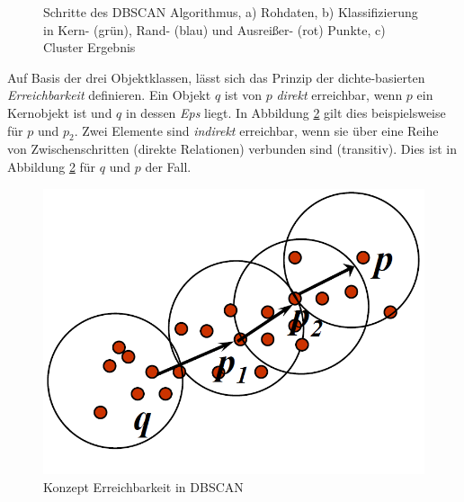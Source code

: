 \begin{figure}[H]
    \centering
    \caption[Schritte des DBSCAN Algorithmus]{Schritte des DBSCAN Algorithmus, a) Rohdaten, b) Klassifizierung in Kern- (grün), Rand- (blau) und Ausreißer- (rot) Punkte, c) Cluster Ergebnis \cite[]{Gao2012}}
    \label{fig:grund_dbscan_clustering}
\end{figure}

Auf Basis der drei Objektklassen, lässt sich das Prinzip der dichte-basierten \textit{Erreichbarkeit} definieren.
Ein Objekt $q$ ist von $p$ \textit{direkt} erreichbar, wenn $p$ ein Kernobjekt ist und $q$ in dessen \textit{Eps} liegt.
In Abbildung \ref{fig:grund_dbscan_reachability} gilt dies beispielsweise für $p$ und $p_2$.
Zwei Elemente sind \textit{indirekt} erreichbar, wenn sie über eine Reihe von Zwischenschritten (direkte Relationen)
verbunden sind (transitiv). Dies ist in Abbildung \ref{fig:grund_dbscan_reachability} für $q$ und $p$ der Fall.

\begin{figure}[H]
    \centering
    \includegraphics[width=0.32\linewidth]{resources/img/grundlagen/clustering_dbscan/reachability}
    \caption[Konzept Erreichbarkeit in DBSCAN]{Konzept Erreichbarkeit in DBSCAN \cite[]{Gao2012}}
    \label{fig:grund_dbscan_reachability}
\end{figure}

